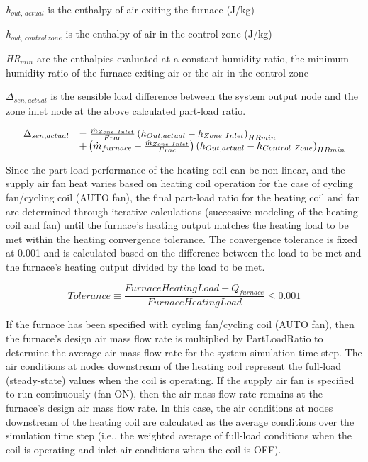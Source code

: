 \emph{h\(_{out,\, actual}\)} is the enthalpy of air exiting the furnace (J/kg)

\emph{h\(_{out,\, control\, zone}\)} is the enthalpy of air in the control zone (J/kg)

\emph{HR\(_{min}\)} are the enthalpies evaluated at a constant humidity ratio, the minimum humidity ratio of the furnace exiting air or the air in the control zone

\(\Delta_{sen,actual}\) is the sensible load difference between the system output node and the zone inlet node at the above calculated part-load ratio.

\begin{equation}
  \begin{array}{rl}
    \Delta_{sen,actual} &= \frac{\dot{m}_{Zone~Inlet}}{Frac} \left(h_{Out,actual} - h_{Zone~Inlet}\right)_{HRmin} \\
                           &+ \left(\dot{m}_{furnace} - \frac{\dot{m}_{Zone~Inlet}}{Frac}\right) \left(h_{Out,actual} - h_{Control~Zone}\right)_{HRmin}
  \end{array}
\end{equation}

Since the part-load performance of the heating coil can be non-linear, and the supply air fan heat varies based on heating coil operation for the case of cycling fan/cycling coil (AUTO fan), the final part-load ratio for the heating coil and fan are determined through iterative calculations (successive modeling of the heating coil and fan) until the furnace's heating output matches the heating load to be met within the heating convergence tolerance. The convergence tolerance is fixed at 0.001 and is calculated based on the difference between the load to be met and the furnace's heating output divided by the load to be met.

\begin{equation}
  Tolerance \equiv \frac{FurnaceHeatingLoad - Q_{furnace}}{FurnaceHeatingLoad} \leq 0.001
\end{equation}

If the furnace has been specified with cycling fan/cycling coil (AUTO fan), then the furnace's design air mass flow rate is multiplied by PartLoadRatio to determine the average air mass flow rate for the system simulation time step. The air conditions at nodes downstream of the heating coil represent the full-load (steady-state) values when the coil is operating. If the supply air fan is specified to run continuously (fan ON), then the air mass flow rate remains at the furnace's design air mass flow rate. In this case, the air conditions at nodes downstream of the heating coil are calculated as the average conditions over the simulation time step (i.e., the weighted average of full-load conditions when the coil is operating and inlet air conditions when the coil is OFF).


